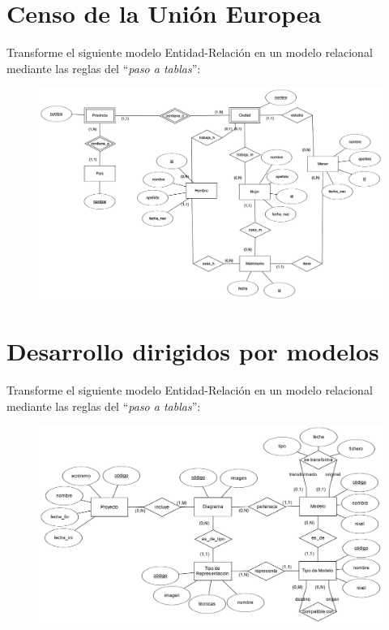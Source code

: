 \documentclass[a4paper]{article}
\begin{document}
\section{Censo de la Unión Europea}

Transforme el siguiente modelo Entidad-Relación en un modelo relacional mediante las reglas del ``\textit{paso a tablas}'':

\begin{figure}[H]
    \centering
    \includegraphics[width=\textwidth]{figs/censo-union-europea}
\end{figure}

\section{Desarrollo dirigidos por modelos}

Transforme el siguiente modelo Entidad-Relación en un modelo relacional mediante las reglas del ``\textit{paso a tablas}'':

\begin{figure}[H]
    \centering
    \includegraphics[width=\textwidth]{figs/desarrollo-dirigido-por-modelos}
\end{figure}
\end{document}
